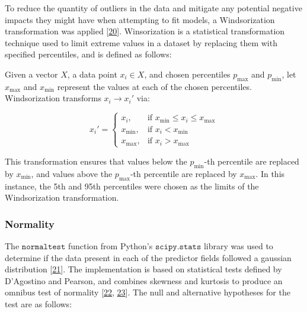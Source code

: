 \documentclass[11pt, oneside]{article}   	%
\begin{document}
To reduce the quantity of outliers in the data and mitigate any potential negative impacts they might have when attempting to fit models, a Windsorization transformation was applied [\href{https://doi.org/10.1214/aoms/1177730388}{20}]. Winsorization is a statistical transformation technique used to limit extreme values in a dataset by replacing them with specified percentiles, and is defined as follows:

Given a vector $X$, a data point $x_i \in X$, and chosen percentiles $p_{\text{max}}$ and $p_{\text{min}}$, let $x_{\text{max}}$ and  $x_{\text{min}}$ represent the values at each of the chosen percentiles. Windsorization transforms $x_i \rightarrow x_i'$ via:

\begin{equation}
	x_i' = 
	\begin{cases} 
		x_i, & \text{if }  x_{\text{min}} \leq x_i \leq  x_{\text{max}} \\
		x_{\text{min}}, & \text{if } x_i <  x_{\text{min}} \\
		x_{\text{max}}, & \text{if } x_i >  x_{\text{max}}
	\end{cases}
\end{equation}

This transformation ensures that values below the $p_{\text{min}}$-th percentile are replaced by $x_{\text{min}}$, and values above the $p_{\text{max}}$-th percentile are replaced by $x_{\text{max}}$. In this instance, the 5th and 95th percentiles were chosen as the limits of the Windsorization transformation. \\




\subsubsection{Normality}

The $\texttt{normaltest}$ function from Python's $\texttt{scipy.stats}$ library was used to determine if the data present in each of the predictor fields followed a gaussian distribution [\href{https://www.nature.com/articles/s41592-019-0686-2}{21}]. The implementation is based on statistical tests defined by D'Agostino and Pearson, and combines skewness and kurtosis to produce an omnibus test of normality [\href{https://doi.org/10.2307/2334522}{22}, \href{https://doi.org/10.2307/2335012}{23}]. The null and alternative hypotheses for the test are as follows:
\end{document}
